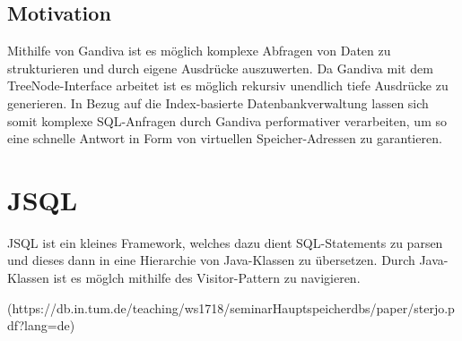 \subsection{Motivation}

Mithilfe von Gandiva ist es möglich komplexe Abfragen von Daten zu strukturieren und durch eigene Ausdrücke auszuwerten. Da Gandiva mit dem TreeNode-Interface arbeitet ist es möglich rekursiv unendlich tiefe Ausdrücke zu generieren. In Bezug auf die Index-basierte Datenbankverwaltung lassen sich somit komplexe SQL-Anfragen durch Gandiva performativer verarbeiten, um so eine schnelle Antwort in Form von virtuellen Speicher-Adressen zu garantieren. 


\section{JSQL}

JSQL ist ein kleines Framework, welches dazu dient SQL-Statements zu parsen und dieses dann in eine Hierarchie von Java-Klassen zu übersetzen.
Durch Java-Klassen ist es möglch mithilfe des Visitor-Pattern zu navigieren.\cite{wumpz:JSQLParser} 



 



(https://db.in.tum.de/teaching/ws1718/seminarHauptspeicherdbs/paper/sterjo.pdf?lang=de)